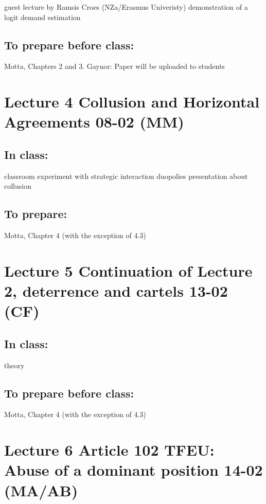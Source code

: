 \documentclass[]{book}
\begin{document}
guest lecture by Ramsis Croes (NZa/Erasmus Univeristy) demonstration of
a logit demand estimation

\subsection{To prepare before class:}\label{to-prepare-before-class-1}

Motta, Chapters 2 and 3. Gaynor: Paper will be uploaded to students

\section{Lecture 4 Collusion and Horizontal Agreements 08-02
(MM)}\label{lecture-4-collusion-and-horizontal-agreements-08-02-mm}

\subsection{In class:}\label{in-class-2}

classroom experiment with strategic interaction duopolies presentation
about collusion

\subsection{To prepare:}\label{to-prepare}

Motta, Chapter 4 (with the exception of 4.3)

\section{Lecture 5 Continuation of Lecture 2, deterrence and cartels
13-02
(CF)}\label{lecture-5-continuation-of-lecture-2-deterrence-and-cartels-13-02-cf}

\subsection{In class:}\label{in-class-3}

theory

\subsection{To prepare before class:}\label{to-prepare-before-class-2}

Motta, Chapter 4 (with the exception of 4.3)

\section{Lecture 6 Article 102 TFEU: Abuse of a dominant position 14-02
(MA/AB)}\label{lecture-6-article-102-tfeu-abuse-of-a-dominant-position-14-02-maab}
\end{document}
